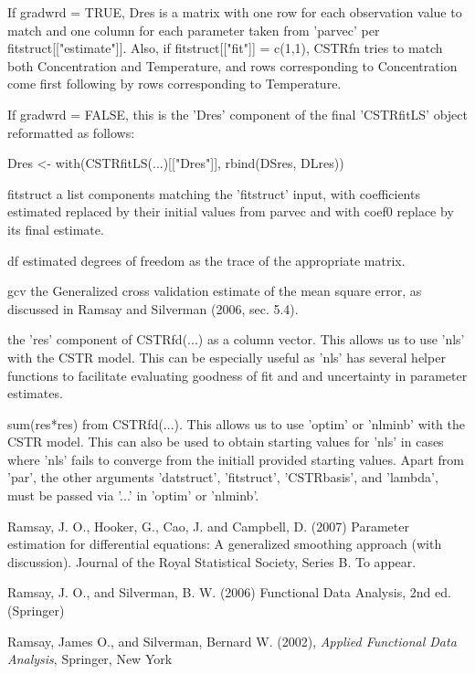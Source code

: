 \documentclass{article}
\begin{document}
\begin{Value}
\begin{ldescription}
{If gradwrd = TRUE, Dres is a matrix with one row for each
observation value to match and one column for each parameter
taken from 'parvec' per fitstruct[["estimate"]].  Also, if
fitstruct[["fit"]] = c(1,1), CSTRfn tries to  match both
Concentration and Temperature, and rows corresponding to
Concentration come first following by rows corresponding to
Temperature. 

If gradwrd = FALSE, this is the 'Dres' component of the final
'CSTRfitLS' object reformatted as follows:  

Dres <- with(CSTRfitLS(...)[["Dres"]], rbind(DSres, DLres))

\item[fitstruct] a list components matching the 'fitstruct' input, with
coefficients estimated replaced by their initial values from
parvec and with coef0 replace by its final estimate. 

\item[df] estimated degrees of freedom as the trace of the appropriate
matrix. 

\item[gcv] the Generalized cross validation estimate of the mean square
error, as discussed in Ramsay and Silverman (2006, sec. 5.4).   

} 

\item[\code{CSTRres, CSTRres0}] the 'res' component of CSTRfd(...) as a column vector.  This allows
us to use 'nls' with the CSTR model.  This can be especially useful
as 'nls' has several helper functions to facilitate evaluating
goodness of fit and and uncertainty in parameter estimates.  

\item[\code{CSTRsse}] sum(res*res) from CSTRfd(...).  This allows us to use 'optim' or
'nlminb' with the CSTR model.  This can also be used to obtain
starting values for 'nls' in cases where 'nls' fails to converge
from the initiall provided starting values.  Apart from 'par', the
other arguments 'datstruct', 'fitstruct', 'CSTRbasis', and 'lambda',
must be passed via '...' in 'optim' or 'nlminb'.  

\end{ldescription}
\end{Value}
\begin{References}\relax
Ramsay, J. O., Hooker, G., Cao, J. and Campbell, D. (2007) Parameter
estimation for differential equations: A generalized smoothing
approach (with discussion). Journal of the Royal Statistical Society,
Series B. To appear.

Ramsay, J. O., and Silverman, B. W. (2006) Functional Data Analysis,
2nd ed. (Springer)

Ramsay, James O., and Silverman, Bernard W. (2002), \emph{Applied
Functional Data Analysis}, Springer, New York
\end{References}
\end{document}
